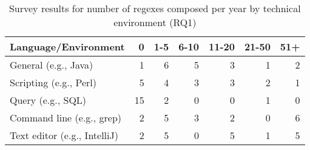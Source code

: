 \begin{table}[t]
\caption{Survey results for number of regexes composed per year by technical environment (RQ1) \label{tab:regexenviron}}
\begin{center}
\begin{small}
\begin{tabular}{l | r @{  \horiz} r @{ \horiz } r @{ \horiz } r @{ \horiz } r @{ \horiz } r }
\toprule
\textbf{Language/Environment} & 0 & 1-5 & 6-10 & 11-20 & 21-50 & 51+ \\  \midrule \bigstrut
General  (e.g., Java)  & 1 & 6 & 5 & 3& 1& 2 \\ \midrule \bigstrut
Scripting  (e.g., Perl) &5 &4 &3 &3 &2  &1 \\ \midrule \bigstrut
Query  (e.g., SQL) & 15&2 &0 &0 &1  & 0\\ \midrule \bigstrut
Command line (e.g., grep)   &2 &5 &3 &2 &0  &6 \\ \midrule \bigstrut
Text editor (e.g., IntelliJ)   & 2& 5& 0& 5& 1& 5\\
\bottomrule
\end{tabular}
\end{small}
\end{center}
\vspace{-12pt}
\end{table}
